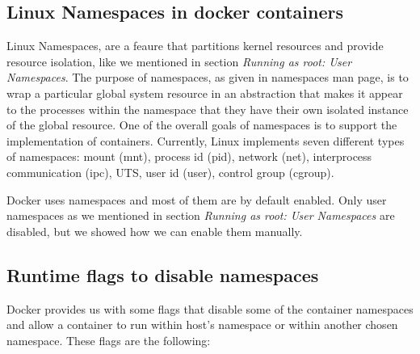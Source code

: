 \subsection{Linux Namespaces in docker containers}
Linux Namespaces, are a feaure that partitions kernel resources and provide resource isolation, like we mentioned in section \textit{Running as root: User Namespaces}.  The purpose of namespaces, as given in namespaces man page, is to wrap a particular global system resource in an abstraction that makes it appear to the processes within the namespace that they have their own isolated instance of the global resource. One of the overall goals of namespaces is to support the implementation of containers. 
Currently, Linux implements seven different types of namespaces: mount (mnt), process id (pid), network (net), interprocess communication (ipc), UTS, user id (user), control group (cgroup).

Docker uses namespaces and most of them are by default enabled. Only user namespaces as we mentioned in section \textit{Running as root: User Namespaces} are disabled, but we showed how we can enable them manually.

\subsection{Runtime flags to disable namespaces}
Docker provides us with some flags that disable some of the container namespaces and allow a container to run within host's namespace or within another chosen namespace. These flags are the following:

